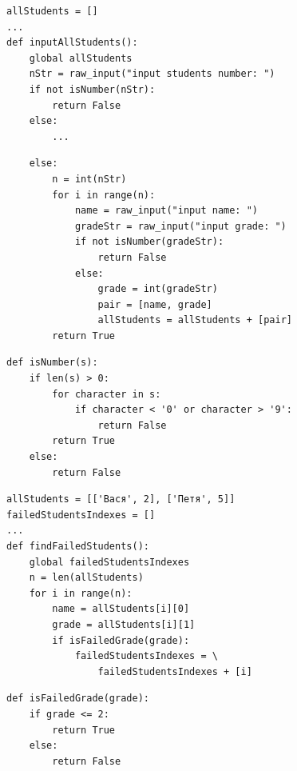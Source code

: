 {\begin{frame}[fragile]
  \begin{verbatim}
allStudents = []
...
def inputAllStudents():
    global allStudents
    nStr = raw_input("input students number: ")
    if not isNumber(nStr):
        return False
    else:
        ...
  \end{verbatim}
\end{frame}

\begin{frame}[fragile]
  \begin{verbatim}
    else:
        n = int(nStr)
        for i in range(n):
            name = raw_input("input name: ")
            gradeStr = raw_input("input grade: ")
            if not isNumber(gradeStr):
                return False
            else:
                grade = int(gradeStr)
                pair = [name, grade]
                allStudents = allStudents + [pair]
        return True
  \end{verbatim}
\end{frame}

\begin{frame}[fragile]
  \begin{verbatim}
def isNumber(s):
    if len(s) > 0:
        for character in s:
            if character < '0' or character > '9':
                return False
        return True
    else:
        return False
  \end{verbatim}
\end{frame}

\begin{frame}[fragile]
  \begin{verbatim}
allStudents = [['Вася', 2], ['Петя', 5]]
failedStudentsIndexes = []
...
def findFailedStudents():
    global failedStudentsIndexes
    n = len(allStudents)
    for i in range(n):
        name = allStudents[i][0]
        grade = allStudents[i][1]
        if isFailedGrade(grade):
            failedStudentsIndexes = \
                failedStudentsIndexes + [i]
  \end{verbatim}
\end{frame}

\begin{frame}[fragile]
  \begin{verbatim}
def isFailedGrade(grade):
    if grade <= 2:
        return True
    else:
        return False
  \end{verbatim}
\end{frame}

}
